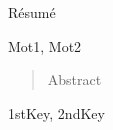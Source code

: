 \begin{resume}
 Résumé
\end{resume}
\begin{motscles}
 Mot1, Mot2
\end{motscles}

\begin{abstract}
 Abstract
\end{abstract}
\begin{keywords}
 1stKey, 2ndKey
\end{keywords}
